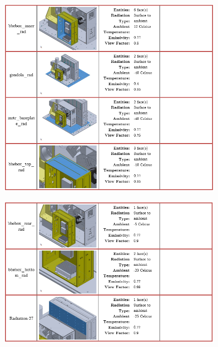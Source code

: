 \begin{figure}
    \centering
    \includegraphics[width=\textwidth]{thermal_load_images/float_TL_images/float_9.PNG}
\end{figure}

\begin{figure}
    \centering
    \includegraphics[width=\textwidth]{thermal_load_images/float_TL_images/float_10.PNG}
\end{figure}

